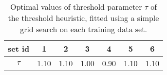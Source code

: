 

\begin{knitrout}
\color{fgcolor}\begin{table}[H]
\centering
\caption{\label{tab:unnamed-chunk-2}Optimal values of threshold parameter $\tau$ of the threshold
    heuristic, fitted using a simple grid search on each training data
    set.  \label{tab:tau_opt}}
\centering
\begin{tabular}[t]{ccccccc}
\toprule
set id & 1 & 2 & 3 & 4 & 5 & 6\\
\midrule
$\tau$ & 1.10 & 1.10 & 1.00 & 0.90 & 1.10 & 1.10\\
\bottomrule
\end{tabular}
\end{table}

\end{knitrout}
